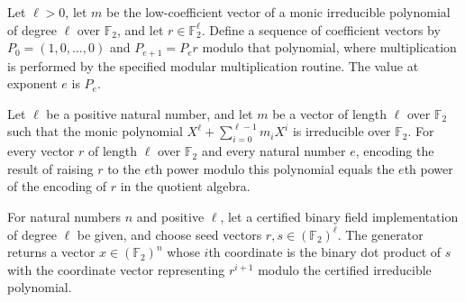 \begin{definition}
\label{FABL.binaryPowMod}
\leanok
{}
Let $\ell>0$, let $m$ be the low-coefficient vector of a monic irreducible polynomial of
degree $\ell$ over $\mathbb F_2$, and let $r\in\mathbb F_2^\ell$. Define a sequence of
coefficient vectors by $P_0=(1,0,\ldots,0)$ and $P_{e+1}=P_e r$ modulo that polynomial,
where multiplication is performed by the specified modular multiplication routine. The
value at exponent $e$ is $P_e$.
\end{definition}

\begin{theorem}
\label{FABL.binaryAdjoinRootEncode_binaryPowMod}
\leanok
{}
Let $\ell$ be a positive natural number, and let $m$ be a vector of length $\ell$ over
$\mathbb{F}_2$ such that the monic polynomial $X^\ell+\sum_{i=0}^{\ell-1}m_iX^i$ is
irreducible over $\mathbb{F}_2$. For every vector $r$ of length $\ell$ over
$\mathbb{F}_2$ and every natural number $e$, encoding the result of raising $r$ to the
$e$th power modulo this polynomial equals the $e$th power of the encoding of $r$ in the
quotient algebra.
\end{theorem}

\begin{definition}
\label{FABL.executableSmallBiasGenerator}
\leanok
{}
For natural numbers $n$ and positive $\ell$, let a certified binary field implementation
of degree $\ell$ be given, and choose seed vectors $r,s\in(\mathbb{F}_2)^\ell$. The
generator returns a vector $x\in(\mathbb{F}_2)^n$ whose $i$th coordinate is the binary
dot product of $s$ with the coordinate vector representing $r^{i+1}$ modulo the
certified irreducible polynomial.
\end{definition}

